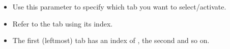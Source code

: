 
\begin{itemize}
\item Use this parameter to specify which tab you want to select/activate. 
\item Refer to the tab using its index.
\item The first (leftmost) tab has an index of , the second  and so on.
\end{itemize}

    
